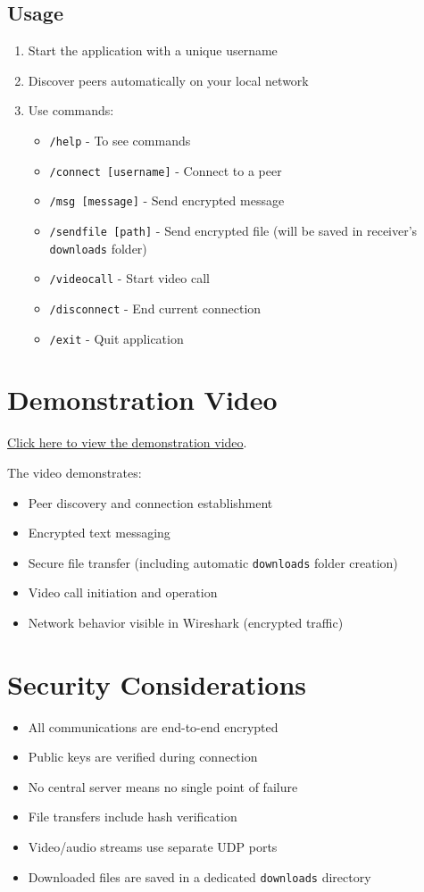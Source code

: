 \documentclass{article}
\begin{document}
\subsection*{Usage}
\begin{enumerate}
    \item Start the application with a unique username
    \item Discover peers automatically on your local network
    \item Use commands:
    \begin{itemize}
        \item \texttt{/help} - To see commands
        \item \texttt{/connect [username]} - Connect to a peer
        \item \texttt{/msg [message]} - Send encrypted message
        \item \texttt{/sendfile [path]} - Send encrypted file (will be saved in receiver's \texttt{downloads} folder)
        \item \texttt{/videocall} - Start video call
        \item \texttt{/disconnect} - End current connection
        \item \texttt{/exit} - Quit application
    \end{itemize}
\end{enumerate}

\section*{Demonstration Video}
\href{https://youtu.be/example-link}{Click here to view the demonstration video}.

The video demonstrates:
\begin{itemize}
    \item Peer discovery and connection establishment
    \item Encrypted text messaging
    \item Secure file transfer (including automatic \texttt{downloads} folder creation)
    \item Video call initiation and operation
    \item Network behavior visible in Wireshark (encrypted traffic)
\end{itemize}

\section*{Security Considerations}
\begin{itemize}
    \item All communications are end-to-end encrypted
    \item Public keys are verified during connection
    \item No central server means no single point of failure
    \item File transfers include hash verification
    \item Video/audio streams use separate UDP ports
    \item Downloaded files are saved in a dedicated \texttt{downloads} directory
\end{itemize}
\end{document}
